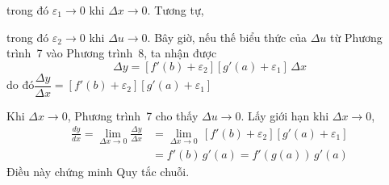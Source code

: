 \noindent
trong đó $\varepsilon_1 \to 0$ khi $\Delta x \to 0$. Tương tự,

\vspace{0.4em}
\noindent
{}
\vspace{0.4em}

\noindent
trong đó $\varepsilon_2 \to 0$ khi $\Delta u \to 0$. Bây giờ, nếu thế biểu thức của $\Delta u$ từ Phương trình~7 vào Phương trình~8, ta nhận được
\[
\Delta y = [f'(b) + \varepsilon_2][g'(a) + \varepsilon_1]\,\Delta x
\]
\noindent
do đó\hfill $\dfrac{\Delta y}{\Delta x} = [f'(b) + \varepsilon_2][g'(a) + \varepsilon_1]$\hfill\null

\vspace{0.6em}
\noindent
Khi $\Delta x \to 0$, Phương trình~7 cho thấy $\Delta u \to 0$. Lấy giới hạn khi $\Delta x \to 0$,
\[
\begin{aligned}
\frac{dy}{dx} = \lim_{\Delta x \to 0} \frac{\Delta y}{\Delta x} &= \lim_{\Delta x \to 0}\,[f'(b) + \varepsilon_2][g'(a) + \varepsilon_1] \\[5pt]
&= f'(b)\,g'(a) = f'(g(a))\,g'(a)
\end{aligned}
\]
\noindent
Điều này chứng minh Quy tắc chuỗi.\hfill{\color{stewartred}\raisebox{0.1ex}{\rule{1.1ex}{1.1ex}}}
